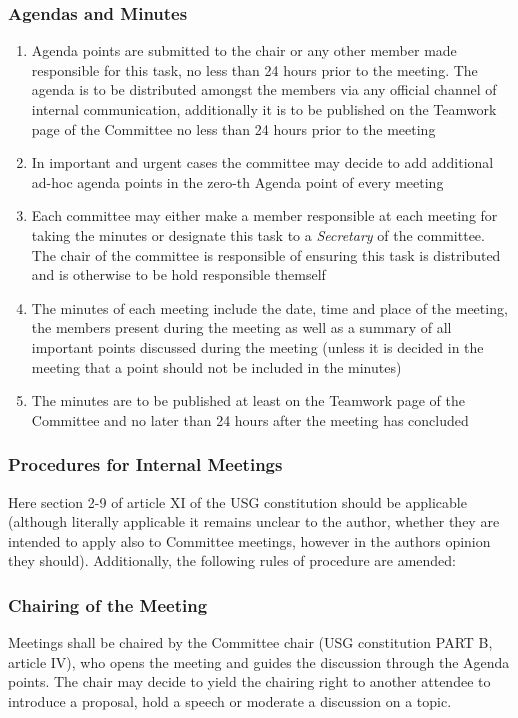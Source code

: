 \subsubsection[Agendas and Minutes]{Agendas and Minutes}\label{provision:agendas minutes}
\begin{enumerate}
	\item Agenda points are submitted to the chair or any other member made responsible for this task, no less than 24 hours prior to the meeting. The agenda is to be distributed amongst the members via any official channel of internal communication, additionally it is to be published on the Teamwork page of the Committee no less than 24 hours prior to the meeting 
	\item In important and urgent cases the committee may decide to add additional ad-hoc agenda points in the zero-th Agenda point of every meeting
	\item Each committee may either make a member responsible at each meeting for taking the minutes or designate this task to a \emph{Secretary} of the committee. The chair of the committee is responsible of ensuring this task is distributed and is otherwise to be hold responsible themself
	\item The minutes of each meeting include the date, time and place of the meeting, the members present during the meeting as well as a summary of all important points discussed during the meeting (unless it is decided in the meeting that a point should not be included in the minutes)
	\item The minutes are to be published at least on the Teamwork page of the Committee and no later than 24 hours after the meeting has concluded
\end{enumerate}
\subsubsection[Meeting Procedures]{Procedures for Internal Meetings}
Here section 2-9 of article XI of the USG constitution should be applicable (although literally applicable it remains unclear to the author, whether they are intended to apply also to Committee meetings, however in the authors opinion they should). Additionally, the following rules of procedure are amended:
\subsubsection{Chairing of the Meeting}
Meetings shall be chaired by the Committee chair (USG constitution PART B, article IV), who opens the meeting and guides the discussion through the Agenda points. The chair may decide to yield the chairing right to another attendee to introduce a proposal, hold a speech or moderate a discussion on a topic.
